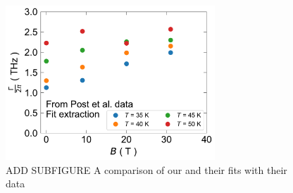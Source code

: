 
\begin{figure}
    \centering
    \includegraphics[width=0.7\textwidth]{figures/fitting_Drude_extracted_Gamma.pdf}
    \caption{ADD SUBFIGURE A comparison of our and their fits with their data}
    \label{fig:drude_fit_good}
\end{figure}
